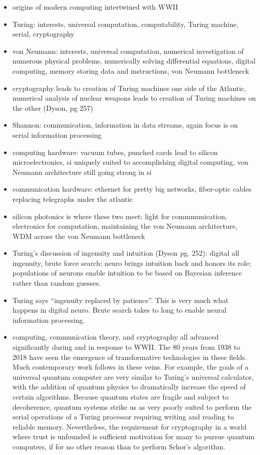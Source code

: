\documentclass[twocolumn]{article}
\begin{document}
\vspace{4em}
\begin{itemize}
\item origins of modern computing intertwined with WWII
\item Turing: interests, universal computation, computability, Turing machine, serial, cryptography
\item von Neumann: interests, universal computation, numerical investigation of numerous physical problems, numerically solving differential equations, digital computing, memory storing data and instructions, von Neumann bottleneck
\item cryptography leads to creation of Turing machines one side of the Atlantic, numerical analysis of nuclear weapons leads to creation of Turing machines on the other (Dyson, pg 257)
\item Shannon: communication, information in data streams, again focus is on serial information processing
\item computing hardware: vacuum tubes, punched cards lead to silicon microelectronics, si uniquely suited to accomplishing digital computing, von Neumann architecture still going strong in si
\item communication hardware: ethernet for pretty big networks, fiber-optic cables replacing telegraphs under the atlantic
\item silicon photonics is where these two meet: light for commmunication, electronics for computation, maintaining the von Neumann architecture, WDM across the von Neumann bottleneck
\item Turing's discussion of ingenuity and intuition (Dyson pg. 252): digital all ingenuity, brute force search; neuro brings intuition back and honors its role; populations of neurons enable intuition to be based on Bayesian inference rather than random guesses.
\item Turing says ``ingenuity replaced by patience''. This is very much what happens in digital neuro. Brute search takes to long to enable neural information processing.
\item computing, communication theory, and cryptography all advanced significantly during and in response to WWII. The 80 years from 1938 to 2018 have seen the emergence of transformative technologies in these fields. Much contemporary work follows in these veins. For example, the goals of a universal quantum computer are very similar to Turing's universal calculator, with the addition of quantum physics to dramatically increase the speed of certain algorithms. Because quantum states are fragile and subject to decoherence, quantum systems strike us as very poorly suited to perform the serial operations of a Turing processor requiring writing and reading to reliable memory. Nevertheless, the requirement for cryptography in a world where trust is unfounded is sufficient motivation for many to pursue quantum computers, if for no other reason than to perform Schor's algorithm.

\end{itemize}
\end{document}
